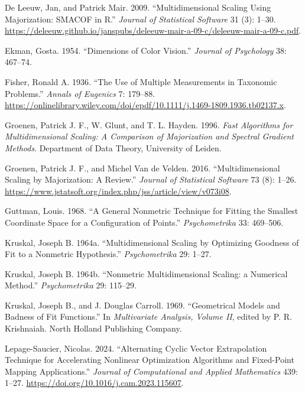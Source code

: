 \documentclass[
  12pt,
  letterpaper,
  DIV=11,
  numbers=noendperiod]{scrartcl}
\newlength{\cslhangindent}
\newenvironment{CSLReferences}[2] %
 {\begin{list}{}{%
  \setlength{\itemindent}{0pt}
  \setlength{\leftmargin}{0pt}
  \setlength{\parsep}{0pt}
  \ifodd #1
   \setlength{\leftmargin}{\cslhangindent}
   \setlength{\itemindent}{-1\cslhangindent}
  \fi
  \setlength{\itemsep}{#2\baselineskip}}}
 {\end{list}}
\begin{document}
\begin{CSLReferences}{1}{1}
De Leeuw, Jan, and Patrick Mair. 2009. {``{Multidimensional Scaling
Using Majorization: SMACOF in R}.''} \emph{Journal of Statistical
Software} 31 (3): 1--30.
\url{https://deleeuw.github.io/janspubs/deleeuw-mair-a-09-c/deleeuw-mair-a-09-c.pdf}.

Ekman, Gosta. 1954. {``{Dimensions of Color Vision}.''} \emph{Journal of
Psychology} 38: 467--74.

Fisher, Ronald A. 1936. {``The Use of Multiple Measurements in Taxonomic
Problems.''} \emph{Annals of Eugenics} 7: 179--88.
\url{https://onlinelibrary.wiley.com/doi/epdf/10.1111/j.1469-1809.1936.tb02137.x}.

Groenen, Patrick J. F., W. Glunt, and T. L. Hayden. 1996. \emph{Fast
Algorithms for Multidimensional Scaling: A Comparison of Majorization
and Spectral Gradient Methods}. Department of Data Theory, University of
Leiden.

Groenen, Patrick J. F., and Michel Van de Velden. 2016.
{``{Multidimensional Scaling by Majorization: A Review}.''}
\emph{Journal of Statistical Software} 73 (8): 1--26.
\url{https://www.jstatsoft.org/index.php/jss/article/view/v073i08}.

Guttman, Louis. 1968. {``{A General Nonmetric Technique for Fitting the
Smallest Coordinate Space for a Configuration of Points}.''}
\emph{Psychometrika} 33: 469--506.

Kruskal, Joseph B. 1964a. {``{Multidimensional Scaling by Optimizing
Goodness of Fit to a Nonmetric Hypothesis}.''} \emph{Psychometrika} 29:
1--27.

Kruskal, Joseph B. 1964b. {``{Nonmetric Multidimensional Scaling: a
Numerical Method}.''} \emph{Psychometrika} 29: 115--29.

Kruskal, Joseph B., and J. Douglas Carroll. 1969. {``{Geometrical Models
and Badness of Fit Functions}.''} In \emph{Multivariate Analysis, Volume
II}, edited by P. R. Krishnaiah. North Holland Publishing Company.

Lepage-Saucier, Nicolas. 2024. {``Alternating Cyclic Vector
Extrapolation Technique for Accelerating Nonlinear Optimization
Algorithms and Fixed-Point Mapping Applications.''} \emph{Journal of
Computational and Applied Mathematics} 439: 1--27.
\url{https://doi.org/10.1016/j.cam.2023.115607}.


\end{CSLReferences}
\end{document}
